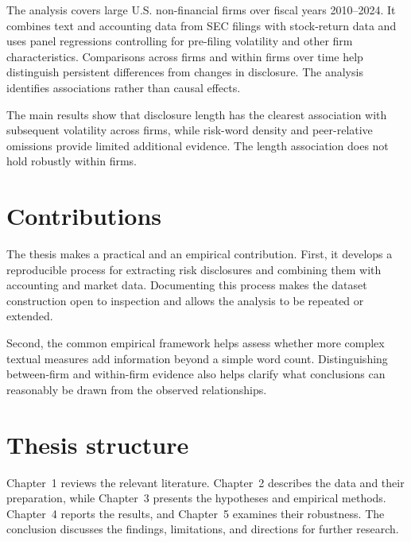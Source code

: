 The analysis covers large U.S. non-financial firms over fiscal years
2010--2024. It combines text and accounting data from SEC filings with
stock-return data and uses panel regressions controlling for pre-filing
volatility and other firm characteristics. Comparisons across firms and within
firms over time help distinguish persistent differences from changes in
disclosure. The analysis identifies associations rather than causal effects.

The main results show that disclosure length has the clearest association with
subsequent volatility across firms, while risk-word density and peer-relative
omissions provide limited additional evidence. The length association does not
hold robustly within firms.

\section*{Contributions}

The thesis makes a practical and an empirical contribution. First, it develops
a reproducible process for extracting risk disclosures and combining them with
accounting and market data. Documenting this process makes the dataset
construction open to inspection and allows the analysis to be repeated or
extended.

Second, the common empirical framework helps assess whether more complex
textual measures add information beyond a simple word count. Distinguishing
between-firm and within-firm evidence also helps clarify what conclusions can
reasonably be drawn from the observed relationships.

\section*{Thesis structure}

Chapter~1 reviews the relevant literature. Chapter~2 describes the data and
their preparation, while Chapter~3 presents the hypotheses and empirical
methods. Chapter~4 reports the results, and Chapter~5 examines their
robustness. The conclusion discusses the findings, limitations, and directions
for further research.

